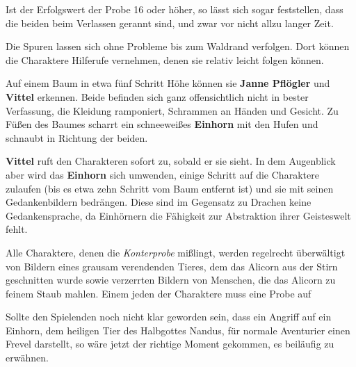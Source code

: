 Ist der Erfolgswert der Probe 16 oder höher, so lässt sich sogar feststellen, dass die beiden beim Verlassen gerannt sind, und zwar vor nicht allzu langer Zeit.

Die Spuren lassen sich ohne Probleme bis zum Waldrand verfolgen. Dort können die Charaktere Hilferufe vernehmen, denen sie relativ leicht folgen können.
\begin{center}
\end{center}

Auf einem Baum in etwa fünf Schritt Höhe können sie \textbf{Janne Pflögler} und \textbf{Vittel} erkennen.
	Beide befinden sich ganz offensichtlich nicht in bester Verfassung, die Kleidung ramponiert, Schrammen an Händen und Gesicht.
	Zu Füßen des Baumes scharrt ein schneeweißes \textbf{Einhorn} mit den Hufen und schnaubt in Richtung der beiden.
	
	\textbf{Vittel} ruft den Charakteren sofort zu, sobald er sie sieht.
	In dem Augenblick aber wird das \textbf{Einhorn} sich umwenden, einige Schritt auf die Charaktere zulaufen (bis es etwa zehn Schritt vom Baum entfernt ist) und sie mit seinen Gedankenbildern bedrängen.
	Diese sind im Gegensatz zu Drachen keine Gedankensprache, da Einhörnern die Fähigkeit zur Abstraktion ihrer Geisteswelt fehlt.
 




Alle Charaktere, denen die \textit{Konterprobe} mißlingt, werden  regelrecht überwältigt von Bildern eines grausam verendenden Tieres, dem das Alicorn aus der Stirn geschnitten wurde sowie verzerrten Bildern von Menschen, die das Alicorn zu feinem Staub mahlen. Einem jeden der Charaktere muss eine Probe auf 



Sollte den Spielenden noch nicht klar geworden sein, dass ein Angriff auf ein Einhorn, dem heiligen Tier des Halbgottes Nandus, für normale Aventurier einen Frevel darstellt, so wäre jetzt der richtige Moment gekommen, es beiläufig zu erwähnen.


